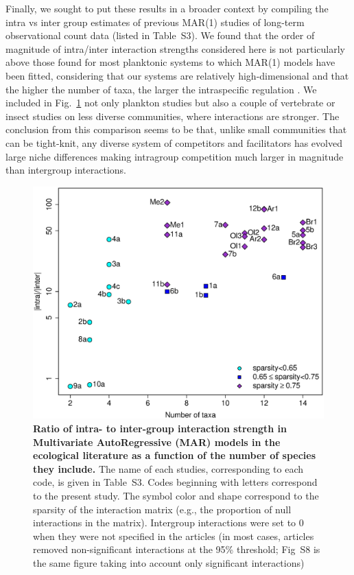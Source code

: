 \documentclass[10pt]{article}
\begin{document}
Finally, we sought to put these results in a broader context by compiling
the intra vs inter group estimates of previous MAR(1) studies of long-term
observational count data (listed in Table~S3). We found that the
order of magnitude of intra/inter interaction strengths considered
here is not particularly above those found for most planktonic systems
to which MAR(1) models have been fitted, considering that our systems
are relatively high-dimensional and that the higher the number of
taxa, the larger the intraspecific regulation \citep{barabas_self-regulation_2017}.
We included in Fig.~\ref{fig:meta_ratio} not only plankton studies
but also a couple of vertebrate or insect studies on less diverse
communities, where interactions are stronger. The conclusion from
this comparison seems to be that, unlike small communities that can
be tight-knit, any diverse system of competitors and facilitators
has evolved large niche differences making intragroup competition
much larger in magnitude than intergroup interactions.

\begin{figure}[!h]
\centering \includegraphics[width=0.8\linewidth]{Ratio_function_dim}
\caption{\textbf{Ratio of intra- to inter-group interaction strength in Multivariate
AutoRegressive (MAR) models in the ecological literature as a function
of the number of species they include.} The name of each studies,
corresponding to each code, is given in Table~S3. Codes beginning
with letters correspond to the present study. The symbol color and
shape correspond to the sparsity of the interaction matrix (e.g.,
the proportion of null interactions in the matrix). Intergroup interactions
were set to 0 when they were not specified in the articles (in most
cases, articles removed non-significant interactions at the 95\% threshold;
Fig~S8 is the same figure taking into account only significant interactions)}
\label{fig:meta_ratio} 
\end{figure}
\end{document}

